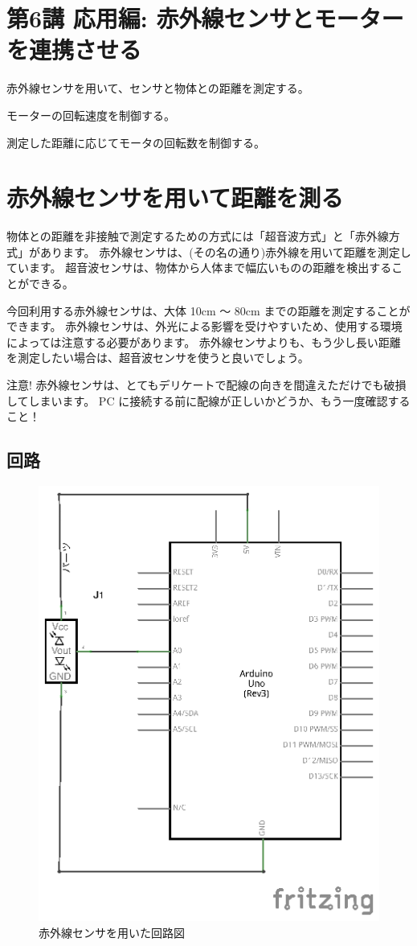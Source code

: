 \documentclass[11pt,a4paper]{jarticle}
\begin{document}
\section*{\LARGE{第6講 応用編: 赤外線センサとモーターを連携させる}}
赤外線センサを用いて、センサと物体との距離を測定する。

モーターの回転速度を制御する。

測定した距離に応じてモータの回転数を制御する。


\section{赤外線センサを用いて距離を測る}
物体との距離を非接触で測定するための方式には「超音波方式」と「赤外線方式」があります。
赤外線センサは、(その名の通り)赤外線を用いて距離を測定しています。
超音波センサは、物体から人体まで幅広いものの距離を検出することができる。

今回利用する赤外線センサは、大体 10cm 〜 80cm までの距離を測定することができます。
赤外線センサは、外光による影響を受けやすいため、使用する環境によっては注意する必要があります。
赤外線センサよりも、もう少し長い距離を測定したい場合は、超音波センサを使うと良いでしょう。


\begin{itembox}[l]{注意!}
 赤外線センサは、とてもデリケートで配線の向きを間違えただけでも破損してしまいます。
 PC に接続する前に配線が正しいかどうか、もう一度確認すること！
\end{itembox}

\subsection*{回路}
 \begin{figure}[h!]
  \centering
  \includegraphics[width=0.5\columnwidth]{img/Sekigai.eps}
  \caption{赤外線センサを用いた回路図}
 \end{figure}
\end{document}
